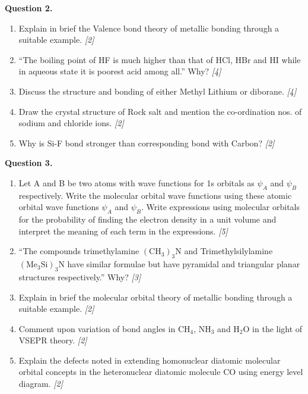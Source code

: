 \documentclass[11pt,a4paper]{article}
\newcommand{\pts}[1]{\hfill \textit{[#1]}}
\begin{document}
\noindent \textbf{Question 2.}
\begin{enumerate}[label=(\alph*)]
  \item Explain in brief the Valence bond theory of metallic bonding through a suitable example. \pts{2}
  \item ``The boiling point of HF is much higher than that of HCl, HBr and HI while in aqueous state it is poorest acid among all.'' Why? \pts{4}
  \item Discuss the structure and bonding of either Methyl Lithium or diborane. \pts{4}
  \item Draw the crystal structure of Rock salt and mention the co-ordination nos. of sodium and chloride ions. \pts{2}
  \item Why is Si-F bond stronger than corresponding bond with Carbon? \pts{2}
\end{enumerate}

\bigskip

\noindent \textbf{Question 3.}
\begin{enumerate}[label=(\alph*)]
  \item Let A and B be two atoms with wave functions for 1s orbitals as $\psi_A$ and $\psi_B$ respectively. Write the molecular orbital wave functions using these atomic orbital wave functions $\psi_A$ and $\psi_B$. Write expressions using molecular orbitals for the probability of finding the electron density in a unit volume and interpret the meaning of each term in the expressions. \pts{5}
  \item ``The compounds trimethylamine $(\text{CH}_3)_3\text{N}$ and Trimethylsilylamine $(\text{Me}_3\text{Si})_3\text{N}$ have similar formulae but have pyramidal and triangular planar structures respectively.'' Why? \pts{3}
  \item Explain in brief the molecular orbital theory of metallic bonding through a suitable example. \pts{2}
  \item Comment upon variation of bond angles in $\text{CH}_4$, $\text{NH}_3$ and $\text{H}_2\text{O}$ in the light of VSEPR theory. \pts{2}
  \item Explain the defects noted in extending homonuclear diatomic molecular orbital concepts in the heteronuclear diatomic molecule CO using energy level diagram. \pts{2}
\end{enumerate}

\bigskip
\end{document}
